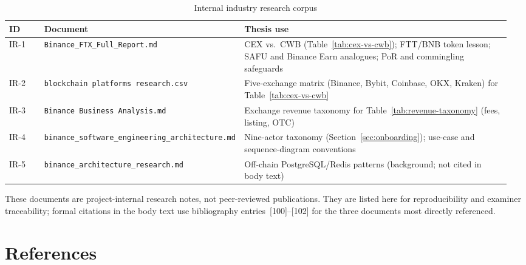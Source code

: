 \documentclass[12pt, a4paper]{report}
\newcommand{\tableheadcolor}{\rowcolor{TableHeadBg}}
\begin{document}
\begin{table}[H]
\centering
\caption[Internal industry research corpus]{Internal industry research corpus}
\label{tab:internal-research}
\begingroup
\footnotesize
\setlength{\tabcolsep}{4pt}
\renewcommand{\arraystretch}{1.15}
\begin{tabular}{@{}%
  >{\raggedright\arraybackslash}p{0.07\linewidth}%
  >{\raggedright\arraybackslash}p{0.36\linewidth}%
  >{\raggedright\arraybackslash}p{0.53\linewidth}@{}}
\toprule
\tableheadcolor
\textbf{ID} & \textbf{Document} & \textbf{Thesis use} \\
\midrule
IR-1 & \texttt{Binance\_FTX\_Full\_Report.md} & CEX vs.\ CWB (Table~\ref{tab:cex-vs-cwb}); FTT/BNB token lesson; SAFU and Binance Earn analogues; PoR and commingling safeguards \\
IR-2 & \texttt{blockchain platforms research.csv} & Five-exchange matrix (Binance, Bybit, Coinbase, OKX, Kraken) for Table~\ref{tab:cex-vs-cwb} \\
IR-3 & \texttt{Binance Business Analysis.md} & Exchange revenue taxonomy for Table~\ref{tab:revenue-taxonomy} (fees, listing, OTC) \\
IR-4 & \texttt{binance\_software\_engineering\_architecture.md} & Nine-actor taxonomy (Section~\ref{sec:onboarding}); use-case and sequence-diagram conventions \\
IR-5 & \texttt{binance\_architecture\_research.md} & Off-chain PostgreSQL/Redis patterns (background; not cited in body text) \\
\bottomrule
\end{tabular}
\endgroup
\end{table}

\noindent These documents are project-internal research notes, not peer-reviewed publications. They are listed here for reproducibility and examiner traceability; formal citations in the body text use bibliography entries~[100]--[102] for the three documents most directly referenced.

\chapter*{References}
{}
\end{document}
